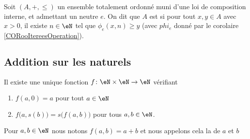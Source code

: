 \begin{definition}      \label{DEFooLCWLooYrToFv}
	Soit \( (A,+, \leq)\) un ensemble totalement ordonné muni d'une loi de composition interne, et admettant un neutre \( e \). On dit que \( A \) est  si pour tout \( x,y\in A\) avec \( x>0\), il existe \( n\in \eN\) tel que \( \phi_e(x,n) \geq y\) (avec \( phi_e \) donné par le corolaire \ref{CORooItereesOperation}).
\end{definition}


\subsection{Addition sur les naturels}
\label{SUBooAdditionNaturels}

\begin{propositionDef}      \label{PROPooVFOXooXmwpFh}
	Il existe une unique fonction \( f\colon \eN\times \eN\to \eN\) vérifiant
	\begin{enumerate}
		\item       \label{ITEMooILZSooNYIkYR}
		      \( f(a,0)=a\) pour tout \( a\in \eN\)
		\item       \label{ITEMooZWHQooBAjZyE}
		      \( f\big( a,s(b) \big)=s\big( f(a,b) \big)\) pour tous \( a,b\in \eN\).
	\end{enumerate}
	Pour \( a,b\in \eN\) nous notons \( f(a,b)=a+b\) et nous appelons cela la  de \( a \) et \( b \)
\end{propositionDef}

